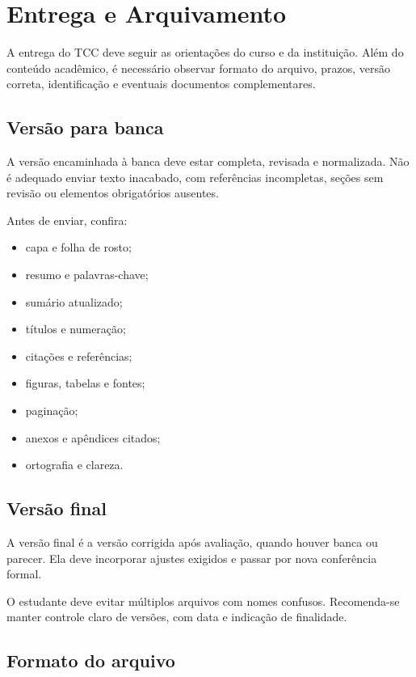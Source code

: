 \chapter{Entrega e Arquivamento}

A entrega do TCC deve seguir as orientações do curso e da instituição. Além do conteúdo acadêmico, é necessário observar formato do arquivo, prazos, versão correta, identificação e eventuais documentos complementares.

\section{Versão para banca}

A versão encaminhada à banca deve estar completa, revisada e normalizada. Não é adequado enviar texto inacabado, com referências incompletas, seções sem revisão ou elementos obrigatórios ausentes.

Antes de enviar, confira:

\begin{itemize}
  \item capa e folha de rosto;
  \item resumo e palavras-chave;
  \item sumário atualizado;
  \item títulos e numeração;
  \item citações e referências;
  \item figuras, tabelas e fontes;
  \item paginação;
  \item anexos e apêndices citados;
  \item ortografia e clareza.
\end{itemize}

\section{Versão final}

A versão final é a versão corrigida após avaliação, quando houver banca ou parecer. Ela deve incorporar ajustes exigidos e passar por nova conferência formal.

O estudante deve evitar múltiplos arquivos com nomes confusos. Recomenda-se manter controle claro de versões, com data e indicação de finalidade.

\section{Formato do arquivo}

